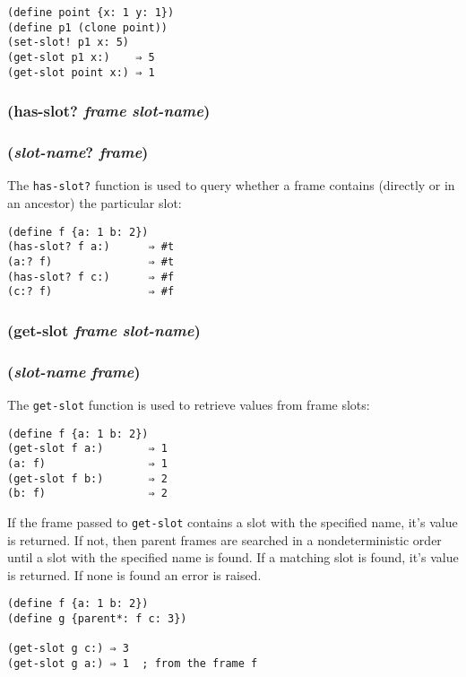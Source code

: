 \documentclass{article}
\begin{document}
\begin{verbatim}
(define point {x: 1 y: 1})
(define p1 (clone point))
(set-slot! p1 x: 5)
(get-slot p1 x:)    ⇒ 5
(get-slot point x:) ⇒ 1
\end{verbatim}

\subsubsection{(has-slot? \emph{frame} \emph{slot-name})}

\subsubsection{(\emph{slot-name}? \emph{frame})}

The \verb|has-slot?| function is used to query whether a frame contains (directly or in an
ancestor) the particular slot:

\begin{verbatim}
(define f {a: 1 b: 2})
(has-slot? f a:)      ⇒ #t
(a:? f)               ⇒ #t
(has-slot? f c:)      ⇒ #f
(c:? f)               ⇒ #f
\end{verbatim}

\subsubsection{(get-slot \emph{frame} \emph{slot-name})}

\subsubsection{(\emph{slot-name} \emph{frame})}

The \verb|get-slot| function is used to retrieve values from frame slots:

\begin{verbatim}
(define f {a: 1 b: 2})
(get-slot f a:)       ⇒ 1
(a: f)                ⇒ 1
(get-slot f b:)       ⇒ 2
(b: f)                ⇒ 2
\end{verbatim}

If the frame passed to \verb|get-slot| contains a slot with the specified name, it’s value
is returned. If not, then parent frames are searched in a nondeterministic order until a slot
with the specified name is found. If a matching slot is found, it’s value is returned. If none
is found an error is raised.

\begin{verbatim}
(define f {a: 1 b: 2})
(define g {parent*: f c: 3})

(get-slot g c:) ⇒ 3
(get-slot g a:) ⇒ 1  ; from the frame f
\end{verbatim}
\end{document}

